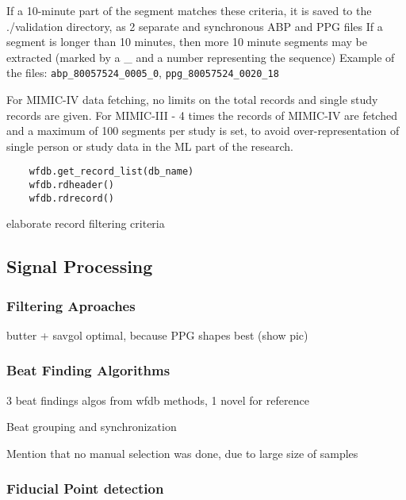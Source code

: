 If a 10-minute part of the segment matches these criteria, it is saved to the ./validation directory, as 2 separate and synchronous ABP and PPG files
If a segment is longer than 10 minutes, then more 10 minute segments may be extracted (marked by a \_ and a number representing the sequence)
Example of the files: \texttt{abp\_80057524\_0005\_0}, \texttt{ppg\_80057524\_0020\_18}

For MIMIC-IV data fetching, no limits on the total records and single study records are given.
For MIMIC-III - 4 times the records of MIMIC-IV are fetched and a maximum of 100 segments per study is set, to avoid over-representation of single person or study data in the ML part of the research.

\begin{verbatim}
    wfdb.get_record_list(db_name)
    wfdb.rdheader()
    wfdb.rdrecord()
\end{verbatim}

%


elaborate record filtering criteria

\subsection{Signal Processing}
\label{subsec:signal-processing}

\subsubsection{Filtering Aproaches}

butter + savgol optimal, because PPG shapes best (show pic)

\subsubsection{Beat Finding Algorithms}

3 beat findings algos from wfdb methods, 1 novel for reference

Beat grouping and synchronization

Mention that no manual selection was done, due to large size of samples

\subsubsection{Fiducial Point detection}

